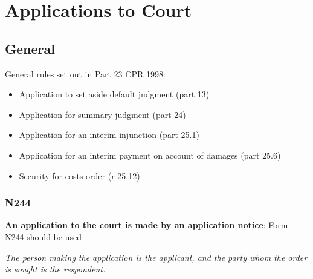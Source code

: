 \documentclass[
]{article}
\providecommand{\tightlist}{%
  \setlength{\itemsep}{0pt}\setlength{\parskip}{0pt}}
\begin{document}
\hypertarget{applications-to-court}{%
\section{Applications to Court}\label{applications-to-court}}

\hypertarget{general}{%
\subsection{General}\label{general}}

General rules set out in Part 23 CPR 1998:

\begin{itemize}
\tightlist
\item
  Application to set aside default judgment (part 13)
\item
  Application for summary judgment (part 24)
\item
  Application for an interim injunction (part 25.1)
\item
  Application for an interim payment on account of damages (part 25.6)
\item
  Security for costs order (r 25.12)
\end{itemize}

\hypertarget{n244}{%
\subsubsection{N244}\label{n244}}

\textbf{An application to the court is made by an application notice}:
Form N244 should be used

\emph{The person making the application is the applicant, and the party
whom the order is sought is the respondent.}
\end{document}
